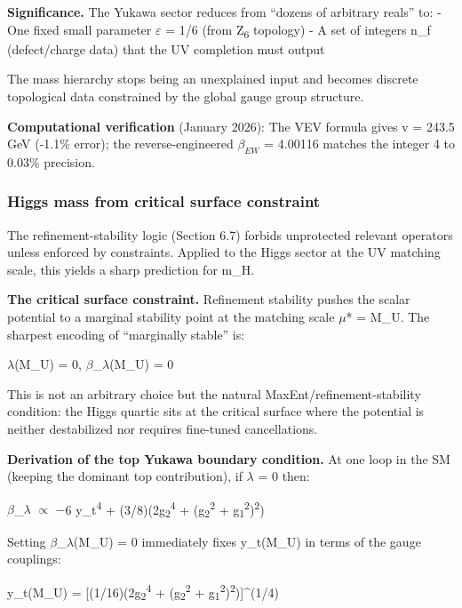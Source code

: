 \documentclass[11pt,a4paper]{article}
\theoremstyle{remark}
\begin{document}
\textbf{Significance.} The Yukawa sector reduces from ``dozens of arbitrary reals'' to:
- One fixed small parameter \ensuremath{\varepsilon} = 1/6 (from Z\textsubscript{6} topology)
- A set of integers n\_f (defect/charge data) that the UV completion must output

The mass hierarchy stops being an unexplained input and becomes discrete
topological data constrained by the global gauge group structure.

\textbf{Computational verification} (January 2026): The VEV formula gives v = 243.5 GeV
(-1.1\% error); the reverse-engineered $\beta_{EW}$ = 4.00116 matches the integer 4
to 0.03\% precision.

\subsubsection{Higgs mass from critical surface constraint}\label{higgs-mass-from-critical-surface-constraint}

The refinement-stability logic (Section 6.7) forbids unprotected relevant operators unless enforced by constraints. Applied to the Higgs sector at the UV matching scale, this yields a sharp prediction for m\_H.

\textbf{The critical surface constraint.} Refinement stability pushes the scalar potential to a marginal stability point at the matching scale \ensuremath{\mu}* = M\_U. The sharpest encoding of ``marginally stable'' is:

\ensuremath{\lambda}(M\_U) = 0, \ensuremath{\beta}\_\ensuremath{\lambda}(M\_U) = 0

This is not an arbitrary choice but the natural MaxEnt/refinement-stability condition: the Higgs quartic sits at the critical surface where the potential is neither destabilized nor requires fine-tuned cancellations.

\textbf{Derivation of the top Yukawa boundary condition.} At one loop in the SM (keeping the dominant top contribution), if \ensuremath{\lambda} = 0 then:

\ensuremath{\beta}\_\ensuremath{\lambda} \ensuremath{\propto} \ensuremath{-}6 y\_t\textsuperscript{4} + (3/8)(2g\textsubscript{2}\textsuperscript{4} + (g\textsubscript{2}\textsuperscript{2} + g\textsubscript{1}\textsuperscript{2})\textsuperscript{2})

Setting \ensuremath{\beta}\_\ensuremath{\lambda}(M\_U) = 0 immediately fixes y\_t(M\_U) in terms of the gauge couplings:

y\_t(M\_U) = {[}(1/16)(2g\textsubscript{2}\textsuperscript{4} + (g\textsubscript{2}\textsuperscript{2} + g\textsubscript{1}\textsuperscript{2})\textsuperscript{2}){]}\^{}(1/4)
\end{document}
